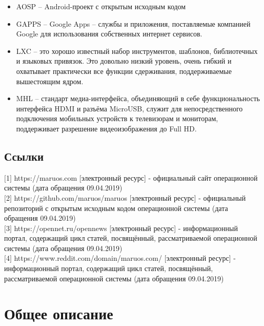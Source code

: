 \documentclass[a4paper, 14pt]{article}
\begin{document}
\begin{itemize}
    \item AOSP -- Android-проект с открытым исходным кодом
    \item GAPPS -- Google Apps -- службы и приложения, поставляемые компанией Google для использования собственных интернет сервисов.
    \item LXC -- это хорошо известный набор инструментов, шаблонов, библиотечных и языковых привязок. Это довольно низкий уровень, очень гибкий и охватывает практически все функции сдерживания, поддерживаемые вышестоящим ядром.
    \item MHL -- стандарт медиа-интерфейса, объединяющий в себе функциональность интерфейса HDMI и разъёма MicroUSB, служит для непосредственного подключения мобильных устройств к телевизорам и мониторам, поддерживает разрешение видеоизображения до Full HD.
\end{itemize}


\subsection{Ссылки}

$[$1$]$ https://maruos.com [электронный ресурс] - официальный сайт операционной системы (дата обращения 09.04.2019)\\

$[$2$]$ https://github.com/maruos/maruos [электронный ресурс] - официальный репозиторий с открытым исходным кодом операционной системы (дата обращения 09.04.2019)\\

$[$3$]$ https://opennet.ru/opennews [электронный ресурс] - информационный портал, содержащий цикл статей, посвящённый, рассматриваемой операционной системы (дата обращения 09.04.2019)\\

$[$4$]$ https://www.reddit.com/domain/maruos.com/ [электронный ресурс] - информационный портал, содержащий цикл статей, посвящённый, рассматриваемой операционной системы (дата обращения 09.04.2019)\\


\section{Общее описание}
\end{document}
